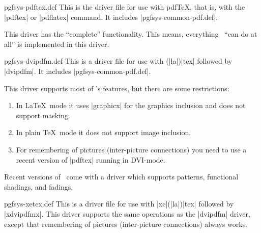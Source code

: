 \begin{filedescription}{pgfsys-pdftex.def}
  This is the driver file for use with pdf\TeX, that is, with the
  |pdftex| or |pdflatex| command. It includes
  |pgfsys-common-pdf.def|.

  This driver has the ``complete'' functionality. This means,
  everything \pgfname\ ``can do at all'' is implemented in this
  driver.
\end{filedescription}

\begin{filedescription}{pgfsys-dvipdfm.def}
  This is a driver file for use with (|la|)|tex| followed by |dvipdfm|. It
  includes |pgfsys-common-pdf.def|.

  This driver supports most of \pgfname's features, but there are some
  restrictions:
  \begin{enumerate}
  \item
    In \LaTeX\ mode it uses |graphicx| for the graphics
    inclusion and does not support masking.
  \item
    In plain \TeX\ mode it does not support image inclusion.
  \item
    For remembering of pictures (inter-picture connections) you need
    to use a recent version of |pdftex| running in DVI-mode.
  \end{enumerate}
  Recent versions of \pgfname\ come with a driver which supports patterns, functional shadings, and fadings.
\end{filedescription}

\begin{filedescription}{pgfsys-xetex.def}
  This is a driver file for use with |xe|(|la|)|tex| followed by
  |xdvipdfmx|. This driver supports the same operations as the |dvipdfm|
  driver,  except that remembering of pictures (inter-picture
  connections)   always works.
\end{filedescription}

